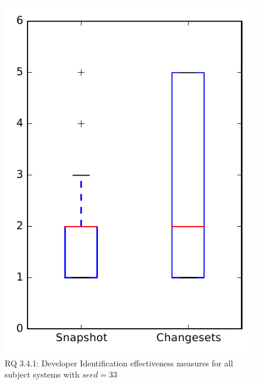 
\begin{figure}
\centering
\includegraphics[height=0.4\textheight]{figures/dit_seed/rq1_overview_33}
\caption{RQ 3.4.1: Developer Identification effectiveness measures for all subject systems with $seed=33$}
\label{fig:dit_seed:rq1:overview}
\end{figure}
